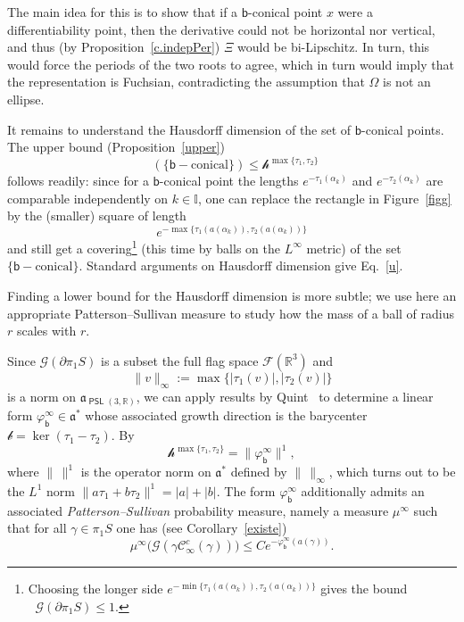 \documentclass[AHL,Unicode,longabstracts,MathTools]{cedram}
\DeclareMathOperator{\Hff}{dim_{Hf{}f}}
\newcommand{\cartan}{a}
\DeclareMathOperator{\PSL}{{\mathsf{PSL}}}
\newcommand{\scr}{\mathscr}
\newcommand{\hC}[1]{{\scr h}^{#1}}
\renewcommand{\varXi}{\mathscr{G}}
\renewcommand{\sf}[1]{{\mathsf{#1}}}
\renewcommand{\flat}{\sf{b}}
\newcommand{\cal}{\mathcal}
\newcommand{\cone}{\cal{C}}
\newcommand{\calF}{\mathcal{F}}
\newcommand{\R}{\mathbb{R}}
\newcommand{\I}{\mathbb{I}}
\newcommand{\g}{\gamma}
\newcommand{\bord}{\partial}
\newcommand{\piS}{\pi_1S}
\newcommand{\ps}{\mu}
\newcommand{\slroot}{{\tau}}
\renewcommand{\/}{\backslash}
\newcommand{\<}{\langle}
\renewcommand{\>}{\rangle}
\renewcommand{\a}{\mathfrak{a}}
\begin{document}
The main idea for this is to show that if a $\flat$-conical point $x$ were a differentiability point, then the derivative could not be horizontal nor vertical, and thus (by Proposition~\ref{c.indepPer}) $\Xi$ would be bi-Lipschitz. In turn, this would force the periods of the two roots to agree, which in turn would imply that the representation is Fuchsian, contradicting the assumption that $\Omega$ is not an ellipse.

It remains to understand the Hausdorff dimension of the set of $\flat$-conical points. The upper bound (Proposition~\ref{upper})
\begin{equation}\label{u}
\Hff(\{\flat-\text{conical}\})\leq\hC{\max\{\slroot_1,\slroot_2\}}
\end{equation}
follows readily: since for a $\flat$-conical point the lengths $e^{-\slroot_1(\alpha_k)}$ and $e^{-\slroot_2(\alpha_k)}$ are comparable independently on $k\in\I$, one can replace the rectangle in Figure~\ref{figg} by the (smaller) square of length
\[
e^{-\max\{\slroot_1(\cartan(\alpha_k)),\slroot_2(\cartan(\alpha_k))\}}
\]
and still get a covering\footnote{Choosing the longer side $e^{-\min\{\slroot_1(\cartan(\alpha_k)),\slroot_2(\cartan(\alpha_k))\}}$ gives the bound {$\Hff\varXi(\bord\piS)\leq 1$.}} (this time by balls on the $L^\infty$ metric) of the set $\{\flat-\text{conical}\}$. Standard arguments on Hausdorff dimension give Eq.~\eqref{u}.



Finding a lower bound for the Hausdorff dimension is more subtle; we use here an appropriate Patterson--Sullivan measure to study how the mass of a ball of radius $r$ scales with $r$.

Since $\varXi(\bord\piS)$ is a subset the full flag space $\calF(\R^3)$ and
\[
\|v\|_\infty:=\max\{|\slroot_1(v)|,|\slroot_2(v)|\}
\]
is a norm on $\a_{\PSL(3,\R)}$, we can apply results by Quint~\cite{Quint-Div} to determine a linear form $\varphi^\infty_\flat\in\a^*$ whose associated growth direction is the barycenter $\scr{b}=\ker(\slroot_1-\slroot_2)$. By~\cite[Proposition~3.3.3]{Quint-Div}
\[
\hC{\max\{\slroot_1,\slroot_2\}}=\|\varphi^\infty_\flat\|^1,
\]
where $\|\,\|^1$ is the operator norm on $\a^*$ defined by $\|\,\|_\infty$, which turns out to be the $L^1$ norm $\|a\slroot_1+b\slroot_2\|^1=|a|+|b|$. The form $\varphi^\infty_\flat$ additionally admits an associated \emph{Patterson--Sullivan} probability measure, namely a measure $\ps^\infty$ such that for all $\g\in\piS$ one has (see Corollary~\ref{existe})
\begin{equation}\label{radi}
\ps^\infty\bigl(\varXi(\g\cone^{c}_\infty(\g))\bigr)\leq Ce^{-\varphi^\infty_\flat(\cartan(\g))}.
\end{equation}
\end{document}
